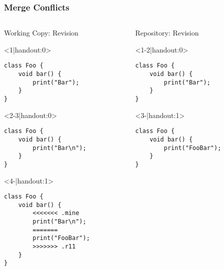 \begin{frame}[fragile]
	\frametitle{Merge Conflicts}	
	\begin{columns}[T, onlytextwidth]
		\begin{column}{0.6\linewidth}
			\begin{columns}[T]
				\begin{column}{0.5\linewidth}
					Working Copy: Revision \only<4>{\emph{11$^*$}}\\[2mm]
					
					\begin{onlyenv}<1|handout:0>
						\begin{lstlisting}[style=java,basicstyle=\fontfamily{pcr}\small\selectfont,numbers=none,escapechar=|]
class Foo {
	void bar() {
		print("Bar");
	}
}	
						\end{lstlisting}
					\end{onlyenv}
					\begin{onlyenv}
						\begin{lstlisting}[style=java,basicstyle=\fontfamily{pcr}\small\selectfont,numbers=none,escapechar=|]
class Foo {
	void bar() {
		print("Bar\n");
	}
}
						\end{lstlisting}
					\end{onlyenv}
					\begin{onlyenv}
						\begin{lstlisting}[style=java,basicstyle=\fontfamily{pcr}\small\selectfont,numbers=none,escapechar=|]
class Foo {
	void bar() {		
		<<<<<<< .mine
		print("Bar\n");
		=======
		print("FooBar");
		>>>>>>> .r11
	}
}	
						\end{lstlisting}
					\end{onlyenv}
				\end{column}
				\begin{column}{0.5\linewidth}					
					Repository: Revision \only<3->{\emph{11}}
					
					\begin{onlyenv}
						\begin{lstlisting}[style=java,basicstyle=\fontfamily{pcr}\small\selectfont,numbers=none,escapechar=|]
class Foo {
	void bar() {
		print("Bar");
	}
}
						\end{lstlisting}
					\end{onlyenv}
					\begin{onlyenv}
						\begin{lstlisting}[style=java,basicstyle=\fontfamily{pcr}\small\selectfont,numbers=none,escapechar=|]
class Foo {
	void bar() {
		print("FooBar");
	}
}
						\end{lstlisting}
					\end{onlyenv}
				\end{column}
			\end{columns}
			

\end{column}
\end{columns}
\end{frame}
